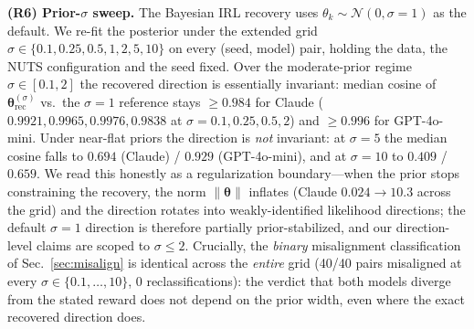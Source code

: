 \documentclass[conference]{IEEEtran}
\begin{document}
\textbf{(R6) Prior-$\sigma$ sweep.} The Bayesian IRL recovery uses
$\theta_k \sim \mathcal{N}(0, \sigma{=}1)$ as the default. We re-fit
the posterior under the extended grid
$\sigma \in \{0.1, 0.25, 0.5, 1, 2, 5, 10\}$ on every (seed, model)
pair, holding the data, the NUTS configuration and the seed fixed.
Over the moderate-prior regime $\sigma \in [0.1, 2]$ the recovered
direction is essentially invariant: median cosine of
$\boldsymbol{\theta}^{(\sigma)}_{\text{rec}}$ vs.\ the
$\sigma{=}1$ reference stays $\ge 0.984$ for Claude
($0.9921, 0.9965, 0.9976, 0.9838$ at $\sigma{=}0.1,0.25,0.5,2$) and
$\ge 0.996$ for GPT-4o-mini. Under near-flat priors the direction is
\emph{not} invariant: at $\sigma{=}5$ the median cosine falls to
$0.694$ (Claude) / $0.929$ (GPT-4o-mini), and at $\sigma{=}10$ to
$0.409$ / $0.659$. We read this honestly as a regularization
boundary---when the prior stops constraining the recovery, the norm
$\|\boldsymbol{\theta}\|$ inflates (Claude $0.024 \!\to\! 10.3$ across
the grid) and the direction rotates into weakly-identified likelihood
directions; the default $\sigma{=}1$ direction is therefore partially
prior-stabilized, and our direction-level claims are scoped to
$\sigma \le 2$. Crucially, the \emph{binary} misalignment
classification of Sec.~\ref{sec:misalign} is identical across the
\emph{entire} grid (40/40 pairs misaligned at every
$\sigma \in \{0.1,\dots,10\}$, 0 reclassifications): the verdict that
both models diverge from the stated reward does not depend on the
prior width, even where the exact recovered direction does.
\end{document}
